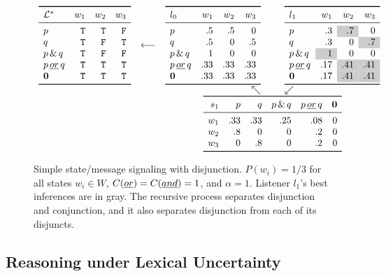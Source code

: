 \documentclass[12pt,twoside]{article}
\newcommand{\word}[1]{\emph{#1}}
\newcommand{\True}{\texttt{T}}
\newcommand{\False}{\texttt{F}}
\newcommand{\States}{W}
\newcommand{\Lex}{\mathcal{L}}
\newcommand{\LexStar}{\Lex^{\ast}}
\newcommand{\Costs}{C}
\newcommand{\Prior}{P}
\newcommand{\listenerZero}{l_{0}}
\newcommand{\speakerOne}{s_{1}}
\newcommand{\listenerOne}{l_{1}}
\newcommand{\nullmsg}{\mathbf{0}}
\newcommand{\graycell}[1]{{\cellcolor[gray]{.8}#1}}
\newcommand{\porq}{p\,\word{or}\,q}
\newcommand{\pandq}{p\,\&\,q}
\newcommand{\listenerMatrix}[6]{
  \begin{array}[c]{l *{4}{r}}
    \toprule
    #1 & w_{1} & w_{2} & w_{3} \\
    \midrule
    p        & #2 \\
    q        & #3 \\              
    \pandq   & #4 \\
    \porq    & #5 \\
    \nullmsg & #6 \\
    \bottomrule
  \end{array}}
\newcommand{\speakerMatrix}[4]{
  \begin{array}[c]{r *{5}{r}}
    \toprule
    #1 & p & q & \pandq & \porq & \nullmsg \\
    \midrule
    w_{1} & #2 \\
    w_{2} & #3 \\ 
    w_{3} & #4 \\ 
    \bottomrule
  \end{array}}
\renewcommand{\_}{\textbf{\textunderscore\hspace{-4pt}\textunderscore\hspace{-3pt}\textunderscore\hspace{-4pt}\textunderscore}\hspace{0.5pt}}			%
\begin{document}
\begin{figure}[tp]
  \centering
  \setlength{\arraycolsep}{3pt} 
  $\begin{array}[b]{c c r@{\hspace{25pt}}l}
     \listenerMatrix%
     {\LexStar}%
     {\True & \True  & \False}%
     {\True & \False & \True}%
     {\True & \False & \False}%
     {\True & \True  & \True}%
     {\True & \True  & \True}%
     &
     \longleftarrow
     &
     \listenerMatrix%
     {\listenerZero}%
     { .5 &  .5 &   0}%
     { .5 &   0 &  .5}%
     {1   &   0 &   0}%
     {.33 & .33 & .33}%
     {.33 & .33 & .33}%
     &
     \listenerMatrix%
     {\listenerOne}%
     { .3 & \graycell{.7} &   0}%
     { .3 &   0 & \graycell{.7}}%
     {\graycell{1} &   0 &   0}%
     { .17 & \graycell{.41} & \graycell{.41}}%
     { .17 & \graycell{.41} & \graycell{.41}}%
   \\
   && \nwarrow & \swarrow
   \\
   &&
   \multicolumn{2}{c}{
      \speakerMatrix%
      {\speakerOne}%
      {.33 & .33 & .25 & .08 & 0}%
      {.8 & 0   &   0 & .2 & 0}%
      {  0 & .8 &   0 & .2 & 0}%
   }
   \end{array}$   
   \caption{Simple state/message signaling with disjunction. 
     $\Prior(w_{i}) = 1/3$ for all states $w_{i} \in \States$,
     $\Costs(\word{or}) = \Costs(\word{and}) = 1$, and 
     $\alpha = 1$. 
     Listener $\listenerOne$'s best inferences are in gray. 
     The recursive process separates disjunction and conjunction, and 
     it also separates disjunction from each of its disjuncts.}
  \label{fig:rsa-disj}
\end{figure}


\subsection{Reasoning under Lexical Uncertainty}\label{sec:full}
\end{document}
